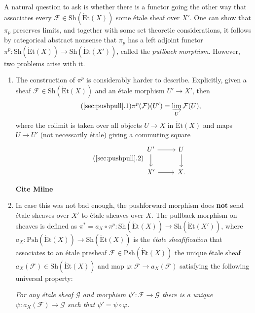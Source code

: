 \documentclass{article}
\newcommand{\Et}{\acute{\mathrm{E}}\mathrm{t}}
\newcommand{\Psh}{\mathrm{Psh}}
\newcommand{\Sh}{\mathrm{Sh}}
\theoremstyle{plain}
\theoremstyle{definition}
\begin{document}
    A natural question to ask is whether there is a functor going the other way that associates every $\mathcal{F}\in\Sh(\Et(X))$ some \'{e}tale sheaf over $X'$. One can show that $\pi_p$ preserves limits, and together with some set theoretic considerations, it follows by categorical abstract nonsense that $\pi_p$ has a left adjoint functor $\pi^p:\Sh(\Et(X))\rightarrow\Sh(\Et(X'))$, called the \textit{pullback morphism}. However, two problems arise with it.
    \begin{enumerate}[(1)]
        \item The construction of $\pi^p$ is considerably harder to describe. Explicitly, given a sheaf $\mathcal{F}\in\Sh(\Et(X))$ and an \'{e}tale morphism $U'\to X'$, then 
        \begin{equation}\label{eqn:pullbacklimit}\tag{\ref{sec:pushpull}.1}
            \pi^p(\mathcal{F})(U')=\varinjlim_U\mathcal{F}(U),
        \end{equation}
        where the colimit is taken over all objects $U\to X$ in $\Et(X)$ and maps $U\to U'$ (not necessarily \'{e}tale) giving a commuting square
        \begin{equation}\label{eqn:squarecom}\tag{\ref{sec:pushpull}.2}
            \begin{tikzcd}
                U' \arrow[r,""] \arrow[d,""] & U \arrow[d,""] \\
                X' \arrow[r,""] & X.
            \end{tikzcd}
        \end{equation}

        \textbf{Cite Milne}
        \item In case this was not bad enough, the pushforward morphism does \textbf{not} send \'{e}tale sheaves over $X'$ to \'{e}tale sheaves over $X$. The pullback morphism on sheaves is defined as $\pi^*=a_X\circ\pi^p:\Sh(\Et(X))\rightarrow\Sh(\Et(X'))$, where $a_X:\Psh(\Et(X))\rightarrow\Sh(\Et(X))$ is the \textit{\'{e}tale sheafification} that associates to an \'{e}tale presheaf $\mathcal{F}\in\Psh(\Et(X))$ the unique \'{e}tale sheaf $a_X(\mathcal{F})\in\Sh(\Et(X))$ and map $\varphi:\mathcal{F}\to a_X(\mathcal{F})$ satisfying the following universal property:
        
        \textit{For any \'{e}tale sheaf $\mathcal{G}$ and morphism $\psi':\mathcal{F}\to\mathcal{G}$ there is a unique $\psi:a_X(\mathcal{F})\to\mathcal{G}$ such that $\psi'=\psi\circ\varphi$.}
    \end{enumerate}
\end{document}
